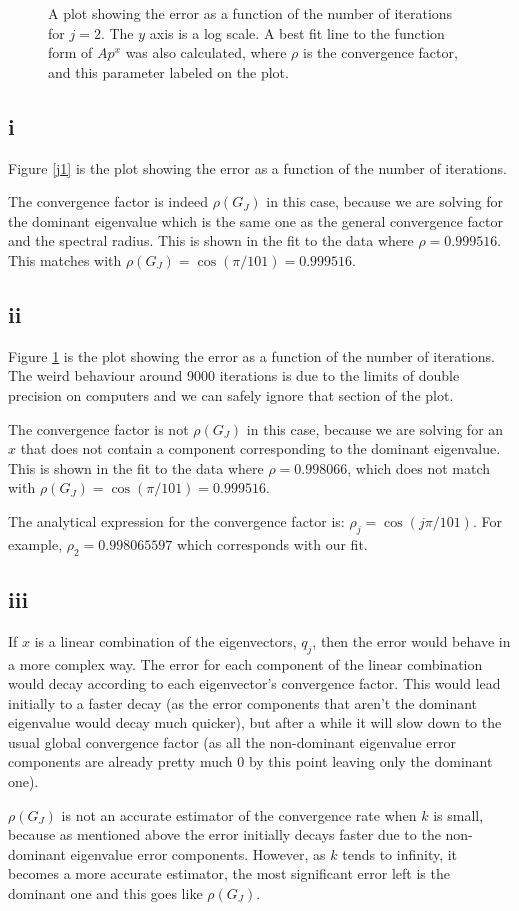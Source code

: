 \documentclass[11pt]{article}
\begin{document}
\begin{figure}
\begin{center}

\caption{ A plot showing the error as a function of the number of iterations for $j=2$. The $y$ axis is a log scale. A best fit line to the function form of $A p^x$ was also calculated, where $\rho$ is the convergence factor, and this parameter labeled on the plot.  }
\label{j2}
\end{center}
\end{figure}

\subsection{i}
Figure \ref{j1} is the plot showing the error as a function of the number of iterations.

The convergence factor is indeed $\rho(G_J)$ in this case, because we are solving for the dominant eigenvalue which is the same one as the general convergence factor and the spectral radius. This is shown in the fit to the data where $\rho = 0.999516$. This matches with $\rho(G_J) = \cos (\pi/101) = 0.999516$. 

\subsection{ii}
Figure \ref{j2} is the plot showing the error as a function of the number of iterations. The weird behaviour around 9000 iterations is due to the limits of double precision on computers and we can safely ignore that section of the plot.

The convergence factor is not $\rho(G_J)$ in this case, because we are solving for an $x$ that does not contain a component corresponding to the dominant eigenvalue. This is shown in the fit to the data where $\rho = 0.998066$, which does not match with $\rho(G_J) = \cos (\pi/101) = 0.999516$.

The analytical expression for the convergence factor is: $\rho_j = \cos( j \pi / 101)$. For example, $\rho_2 = 0.998065597$ which corresponds with our fit.
\subsection{iii}
If $x$ is a linear combination of the eigenvectors, $q_j$, then the error would behave in a more complex way. The error for each component of the linear combination would decay according to each eigenvector's convergence factor. This would lead initially to a faster decay (as the error components that aren't the dominant eigenvalue would decay much quicker), but after a while it will slow down to the usual global convergence factor (as all the non-dominant eigenvalue error components are already pretty much 0 by this point leaving only the dominant one).

$\rho(G_J)$ is not an accurate estimator of the convergence rate when $k$ is small, because as mentioned above the error initially decays faster due to the non-dominant eigenvalue error components. However, as $k$ tends to infinity, it becomes a more accurate estimator, the most significant error left is the dominant one and this goes like $\rho(G_J)$.
\end{document}
